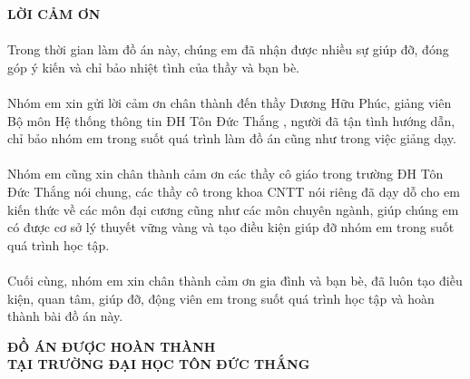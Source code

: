 \documentclass{report}
\begin{document}

\pagestyle{fancy}
\fancyhf{}
\chead{\thepage}
\renewcommand{\headrulewidth}{0pt}
\begin{center}
	\setcounter{page}{1}
	\fontsize{16}{20}\selectfont
	\textbf{LỜI CẢM ƠN\\} 
\end{center}
	\fontsize{13}{15}\selectfont
	\paragraph{}
        Trong thời gian làm đồ án này, chúng em đã nhận được nhiều sự giúp đỡ, đóng góp ý kiến và chỉ bảo nhiệt tình của thầy và bạn bè.
        \paragraph{}
        Nhóm em xin gửi lời cảm ơn chân thành đến thầy Dương Hữu Phúc, giảng viên Bộ môn Hệ thống thông tin ĐH Tôn Đức Thắng , người đã tận tình hướng dẫn, chỉ bảo nhóm em trong suốt quá trình làm đồ án cũng như trong việc giảng dạy.
        \paragraph{}
        Nhóm em cũng xin chân thành cảm ơn các thầy cô giáo trong trường ĐH Tôn Đức Thắng nói chung, các thầy cô trong khoa CNTT nói riêng đã dạy dỗ cho em kiến thức về các môn đại cương cũng như các môn chuyên ngành, giúp chúng em có được cơ sở lý thuyết vững vàng và tạo điều kiện giúp đỡ nhóm em trong suốt quá trình học tập.
        \paragraph{}
        Cuối cùng, nhóm em xin chân thành cảm ơn gia đình và bạn bè, đã luôn tạo điều kiện, quan tâm, giúp đỡ, động viên em trong suốt quá trình học tập và hoàn thành bài đồ án này.
\pagebreak


\begin{center}
	\fontsize{16}{20}\selectfont
	\textbf{ĐỒ ÁN ĐƯỢC HOÀN THÀNH}\\
	\textbf{TẠI TRƯỜNG ĐẠI HỌC TÔN ĐỨC THẮNG\\} 
\end{center}
\fontsize{13}{15}\selectfont
\end{document}

